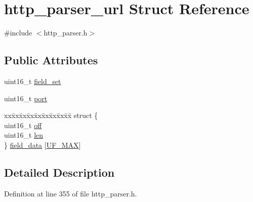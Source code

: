 \hypertarget{structhttp__parser__url}{\section{http\-\_\-parser\-\_\-url Struct Reference}
\label{structhttp__parser__url}
}


{\ttfamily \#include $<$http\-\_\-parser.\-h$>$}

\subsection*{Public Attributes}
\begin{DoxyCompactItemize}
\item 
uint16\-\_\-t \hyperlink{structhttp__parser__url_a77af61a480f11c41938810dd76ca49eb}{field\-\_\-set}
\item 
uint16\-\_\-t \hyperlink{structhttp__parser__url_a875fb8faf3ee45707078eda5435fa563}{port}
\item 
\begin{tabbing}
xx\=xx\=xx\=xx\=xx\=xx\=xx\=xx\=xx\=\kill
struct \{\\
\>uint16\_t \hyperlink{structhttp__parser__url_a6510826f3aa9a1100ac5f714323edeb1}{off}\\
\>uint16\_t \hyperlink{structhttp__parser__url_a60fb784a989dd5a95e5bd19d468d22c7}{len}\\
\} \hyperlink{structhttp__parser__url_a96a1fed71f3471692e9832f91b42f7db}{field\_data} \mbox{[}\hyperlink{http__parser_8h_a9ca1f91c2958091e2ac9e9b2f903d4eba4b40c88291e4fa018de04553e7e1adfd}{UF\_MAX}\mbox{]}\\

\end{tabbing}\end{DoxyCompactItemize}


\subsection{Detailed Description}


Definition at line 355 of file http\-\_\-parser.\-h.



